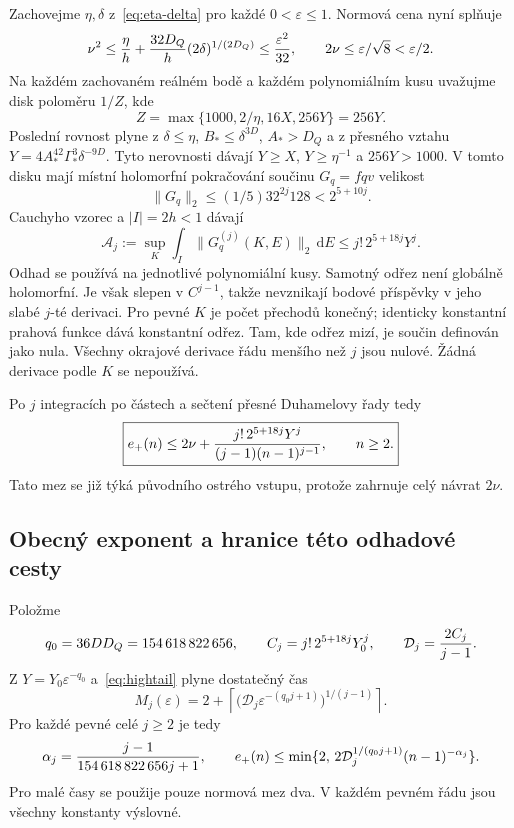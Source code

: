 \documentclass[11pt,a4paper]{article}
\theoremstyle{remark}\newtheorem{remark}[theorem]{Poznámka}
\numberwithin{equation}{section}
\begin{document}
Zachovejme \(\eta,\delta\) z~\eqref{eq:eta-delta} pro každé \(0<\varepsilon\le1\). Normová cena nyní splňuje
\begin{equation}
\nu^2\le{\eta\over h}+{32D_Q\over h}(2\delta)^{1/(2D_Q)}
\le{\varepsilon^2\over32},\qquad
2\nu\le\varepsilon/\sqrt8<\varepsilon/2.
\label{eq:highnormcost}
\end{equation}
Na každém zachovaném reálném bodě a každém polynomiálním kusu uvažujme disk poloměru \(1/Z\), kde
\[
Z=\max\{1000,2/\eta,16X,256Y\}=256Y.
\]
Poslední rovnost plyne z \(\delta\le\eta\), \(B_*\le\delta^{3D}\), \(A_*>D_Q\) a z přesného vztahu \(Y=4A_*^{42}\Gamma_*^3\delta^{-9D}\). Tyto nerovnosti dávají \(Y\ge X\), \(Y\ge\eta^{-1}\) a \(256Y>1000\). V tomto disku mají místní holomorfní pokračování součinu \(G_q=fqv\) velikost
\[
\|G_q\|_2\le(1/5)32^{2j}128<2^{5+10j}.
\]
Cauchyho vzorec a \(|I|=2h<1\) dávají
\begin{equation}
\boxed{\mathcal A_j:={\sup_K}\int_I\|G_q^{(j)}(K,E)\|_2\,\mathrm dE
\le j!\,2^{5+18j}Y^j.}
\label{eq:highderivative}
\end{equation}
Odhad se používá na jednotlivé polynomiální kusy. Samotný odřez není globálně holomorfní. Je však slepen v \(C^{j-1}\), takže nevznikají bodové příspěvky v jeho slabé \(j\)-té derivaci. Pro pevné \(K\) je počet přechodů konečný; identicky konstantní prahová funkce dává konstantní odřez. Tam, kde odřez mizí, je součin definován jako nula. Všechny okrajové derivace řádu menšího než \(j\) jsou nulové. Žádná derivace podle \(K\) se nepoužívá.

Po \(j\) integracích po částech a sečtení přesné Duhamelovy řady tedy
\begin{equation}
\boxed{e_+(n)\le2\nu+
{j!\,2^{5+18j}Y^j\over(j-1)(n-1)^{j-1}},\qquad n\ge2.}
\label{eq:hightail}
\end{equation}
Tato mez se již týká původního ostrého vstupu, protože zahrnuje celý návrat \(2\nu\).

\subsection{Obecný exponent a hranice této odhadové cesty}

Položme
\[
q_0=36DD_Q=154\,618\,822\,656,\qquad
C_j=j!\,2^{5+18j}Y_0^j,\qquad
\mathcal D_j={2C_j\over j-1}.
\]
Z \(Y=Y_0\varepsilon^{-q_0}\) a~\eqref{eq:hightail} plyne dostatečný čas
\[
M_j(\varepsilon)=2+\left\lceil
\bigl(\mathcal D_j\varepsilon^{-(q_0j+1)}\bigr)^{1/(j-1)}
\right\rceil.
\]
Pro každé pevné celé \(j\ge2\) je tedy
\begin{equation}
\alpha_j={j-1\over154\,618\,822\,656j+1},\qquad
e_+(n)\le\min\{2,\,2\mathcal D_j^{1/(q_0j+1)}(n-1)^{-\alpha_j}\}.
\label{eq:highrate}
\end{equation}
Pro malé časy se použije pouze normová mez dva. V každém pevném řádu jsou všechny konstanty výslovné.
\end{document}
